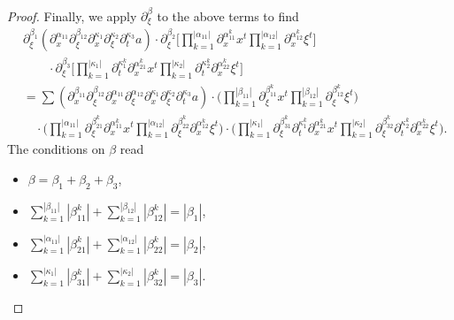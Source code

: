 \documentclass{amsart}
\theoremstyle{definition}
\begin{document}
\begin{proof}
Finally, we apply $\partial_{\xi}^{\beta}$ to the above terms to find
\begin{equation*}
\begin{split}
&\partial_{\xi}^{\beta_1} (\partial_x^{\alpha_{11}} \partial_{\xi}^{\beta_{12}} \partial_x^{\kappa_1} \partial_{\xi}^{\kappa_2} \partial_t^{\kappa_3}  a) \cdot \partial_{\xi}^{\beta_2} \big[ \prod_{k=1}^{|\alpha_{11}|} \partial_x^{\alpha_{11}^k} x^t \prod_{k=1}^{|\alpha_{12}|} \partial_x^{\alpha_{12}^k} \xi^t \big] \\
&\quad \quad \cdot \partial_{\xi}^{\beta_3} \big[ \prod_{k=1}^{|\kappa_1|} \partial_t^{\kappa_1^k} \partial_x^{\alpha_{21}^k} x^t \prod_{k=1}^{|\kappa_2|} \partial_t^{\kappa_2^k} \partial_x^{\alpha_{22}^k} \xi^t \big] \\
&= \sum (\partial_x^{\beta_{11}} \partial_{\xi}^{\beta_{12}} \partial_x^{\alpha_{11}} \partial_{\xi}^{\alpha_{12}} \partial_x^{\kappa_1} \partial_{\xi}^{\kappa_2} \partial_t^{\kappa_3} a) \cdot \big( \prod_{k=1}^{|\beta_{11}|} \partial_{\xi}^{\beta_{11}^k} x^t \prod_{k=1}^{|\beta_{12}|} \partial_{\xi}^{\beta_{12}^k} \xi^t \big) \\
&\quad \cdot \big( \prod_{k=1}^{|\alpha_{11}|} \partial_{\xi}^{\beta_{21}^k} \partial_{x}^{\alpha_{11}^k} x^t \prod_{k=1}^{|\alpha_{12}|} \partial_{\xi}^{\beta_{22}^k} \partial_x^{\alpha_{12}^k} \xi^t \big) \cdot \big( \prod_{k=1}^{|\kappa_1|} \partial_{\xi}^{\beta_{31}^k} \partial_t^{\kappa_1^k} \partial_x^{\alpha_{21}^k} x^t \prod_{k=1}^{|\kappa_2|} \partial_{\xi}^{\beta_{32}^k} \partial_t^{\kappa_2^k} \partial_x^{\alpha_{22}^k} \xi^t \big).
\end{split}
\end{equation*}
The conditions on $\beta$ read
\begin{itemize}
\item $\beta = \beta_1 + \beta_2 + \beta_3$, 
\item $\sum_{k=1}^{|\beta_{11}|} |\beta_{11}^k| + \sum_{k=1}^{|\beta_{12}|} |\beta_{12}^k| = |\beta_1|$, 
\item $\sum_{k=1}^{|\alpha_{11}|} |\beta_{21}^k| + \sum_{k=1}^{|\alpha_{12}|} |\beta_{22}^k| = |\beta_2|$, 
\item $\sum_{k=1}^{|\kappa_1|} |\beta_{31}^k| + \sum_{k=1}^{|\kappa_2|} |\beta_{32}^k| = |\beta_{3}|$.
\end{itemize}


\end{proof}
\end{document}
